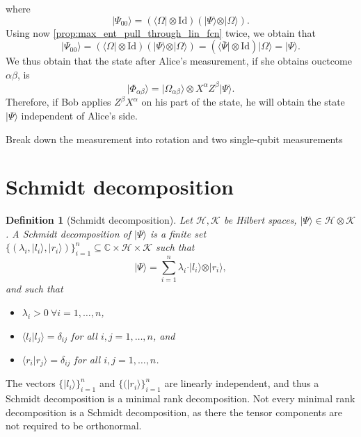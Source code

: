 \documentclass{article}
\newtheorem{definition}{Definition}
\theoremstyle{definition}
\newcommand{\id}{\mathrm{Id}}
\newcommand{\ket}[1]{\vert #1 \rangle}
\newcommand{\bra}[1]{\langle #1 \vert}
\newcommand{\scalprod}[2]{\langle #1 \vert #2 \rangle}
\begin{document}
where 
\begin{equation*}
  \ket{\Psi_{00}} =  (\bra{\Omega} \otimes\id) (\ket{\Psi} \otimes \ket{\Omega}).
\end{equation*}
Using now \cref{prop:max_ent_pull_through_lin_fcn} twice, we obtain that
\begin{equation*}
  \ket{\Psi_{00}} =  (\bra{\Omega} \otimes\id) (\ket{\Psi} \otimes \ket{\Omega}) = (\bra{\bar{\Psi}} \otimes\id) \ket{\Omega} = \ket{\Psi}.
\end{equation*}
We thus obtain that the state after Alice's measurement, if she obtains ouctcome $\alpha\beta$, is
\begin{equation*}
  \ket{\Phi_{\alpha\beta}} = \ket{\Omega_{\alpha\beta}}\otimes X^\alpha Z^\beta \ket{\Psi}.
\end{equation*}
Therefore, if Bob applies $Z^\beta X^\alpha$ on his part of the state, he will obtain the state $\ket{\Psi}$ independent of Alice's side.

{\color{red} Break down the measurement into rotation and two single-qubit measurements}


\section{Schmidt decomposition}

\begin{definition}[Schmidt decomposition]
  Let $\mathcal{H},\mathcal{K}$ be Hilbert spaces, $\ket{\Psi}\in\mathcal{H}\otimes \mathcal{K}$. A Schmidt decomposition of $\ket{\Psi}$ is a finite set $\{(\lambda_i, \ket{l_i}, \ket{r_i})\}_{i=1}^n\subseteq \mathbb{C}\times \mathcal{H}\times \mathcal{K}$ such that
  \begin{equation*}
    \ket{\Psi} = \sum_{i=1}^n \lambda_i \cdot \ket{l_i} \otimes \ket{r_i},
  \end{equation*}
  and such that
  \begin{itemize}
  \item  $\lambda_i> 0\ \forall i = 1,\dots, n$,
  \item $\scalprod{l_i}{l_j} = \delta_{ij}$ for all $i,j=1,\dots, n$, and
  \item $\scalprod{r_i}{r_j} = \delta_{ij}$ for all $i,j=1,\dots, n$.
  \end{itemize}
\end{definition}

The vectors $\{\ket{l_i}\}_{i=1}^n$ and $\{(\ket{r_i}\}_{i=1}^n$ are linearly independent, and thus a Schmidt decomposition is a minimal rank decomposition. Not every minimal rank decomposition is a Schmidt decomposition, as there the tensor components are not required to be orthonormal.
\end{document}
